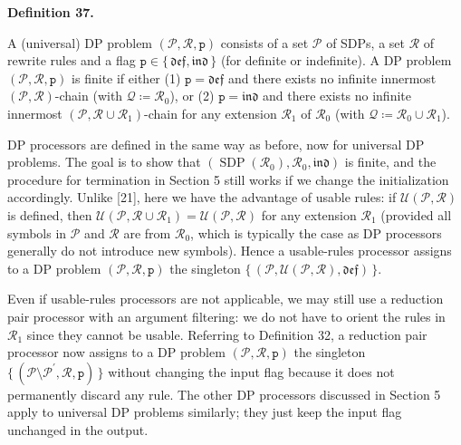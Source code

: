  
 
\par\medskip\noindent\textbf{Definition 37.}\par
 
 
A (universal) DP problem $(\mathcal{P},\mathcal{R},\mathtt{p})$ consists of a set $\mathcal{P}$ of SDPs, a set $\mathcal{R}$ of rewrite rules and a flag $\mathtt{p}\in\{\,\mathfrak{def},\mathfrak{ind}\,\}$ (for definite or indefinite). A DP problem $(\mathcal{P},\mathcal{R},\mathtt{p})$ is finite if either (1) $\mathtt{p}=\mathfrak{def}$ and there exists no infinite innermost $(\mathcal{P},\mathcal{R})$-chain (with $\mathcal{Q}\coloneq\mathcal{R}_{0}$), or (2) $\mathtt{p}=\mathfrak{ind}$ and there exists no infinite innermost $(\mathcal{P},\mathcal{R}\cup\mathcal{R}_{1})$-chain for any extension $\mathcal{R}_{1}$ of $\mathcal{R}_{0}$ (with $\mathcal{Q}\coloneq\mathcal{R}_{0}\cup\mathcal{R}_{1}$).\par
 
 
 
 
DP processors are defined in the same way as before, now for universal DP problems. The goal is to show that $(\operatorname{SDP}(\mathcal{R}_{0}),\mathcal{R}_{0},\mathfrak{ind})$ is finite, and the procedure for termination in Section 5 still works if we change the initialization accordingly. Unlike [21], here we have the advantage of usable rules: if $\mathcal{U}(\mathcal{P},\mathcal{R})$ is defined, then $\mathcal{U}(\mathcal{P},\mathcal{R}\cup\mathcal{R}_{1})=\mathcal{U}(\mathcal{P},\mathcal{R})$ for any extension $\mathcal{R}_{1}$ (provided all symbols in $\mathcal{P}$ and $\mathcal{R}$ are from $\mathcal{R}_{0}$, which is typically the case as DP processors generally do not introduce new symbols). Hence a usable-rules processor assigns to a DP problem $(\mathcal{P},\mathcal{R},\mathtt{p})$ the singleton $\{\,(\mathcal{P},\mathcal{U}(\mathcal{P},\mathcal{R}),\mathfrak{def})\,\}$.\par
 
 
 
Even if usable-rules processors are not applicable, we may still use a reduction pair processor with an argument filtering: we do not have to orient the rules in $\mathcal{R}_{1}$ since they cannot be usable. Referring to Definition 32, a reduction pair processor now assigns to a DP problem $(\mathcal{P},\mathcal{R},\mathtt{p})$ the singleton $\{\,(\mathcal{P}\setminus\mathcal{P}^{\prime},\mathcal{R},\mathtt{p})\,\}$ without changing the input flag because it does not permanently discard any rule. The other DP processors discussed in Section 5 apply to universal DP problems similarly; they just keep the input flag unchanged in the output.\par
 
